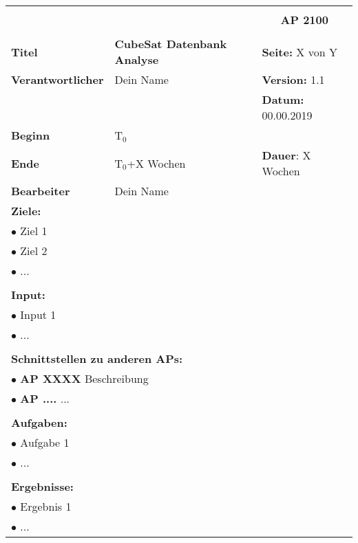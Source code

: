 \begin{table}[!h]
 \begin{center}
  \begin{tabular}{|p{35mm}||p{55mm}|p{50mm}||p{40mm}|}
   \hline
   \multicolumn{3}{|l||}{\textbf{}} & \multicolumn{1}{c|}{}\\
   \multicolumn{3}{|l||}{\textbf{}} & \multicolumn{1}{c|}{\textbf{AP 2100}}\\
   \multicolumn{3}{|l||}{\textbf{}} & \multicolumn{1}{c|}{}\\
   \hline\hline
   \textbf{Titel} & \multicolumn{2}{p{7cm}||}{\textbf{CubeSat Datenbank Analyse}} & \textbf{Seite:} X von Y\\
   \hline
   \textbf{Verantwortlicher} & \multicolumn{2}{l||}{Dein Name} & \textbf{Version:} 1.1\\
   \hline
   \multicolumn{3}{|l||}{} & \textbf{Datum:} 00.00.2019\\
   \hline\hline
   \textbf{Beginn} & \multicolumn{2}{l||}{T$_0$} & \\
   \hline
   \textbf{Ende} & \multicolumn{2}{l||}{T$_0$+X Wochen} & \textbf{Dauer}: X Wochen\\
   \hline\hline
   \textbf{Bearbeiter} & \multicolumn{3}{l|}{Dein Name}\\
   \hline\hline
   \multicolumn{4}{|p{150mm}|}{\textbf{Ziele:}}\\
   \multicolumn{4}{|p{150mm}|}{$\bullet$ Ziel 1}\\
   \multicolumn{4}{|p{150mm}|}{$\bullet$ Ziel 2}\\
   \multicolumn{4}{|p{150mm}|}{$\bullet$ ...}\\
   \multicolumn{4}{|p{150mm}|}{}\\
   \multicolumn{4}{|p{150mm}|}{\textbf{Input:}}\\
   \multicolumn{4}{|p{150mm}|}{$\bullet$ Input 1}\\
   \multicolumn{4}{|p{150mm}|}{$\bullet$ ...}\\
   \multicolumn{4}{|p{150mm}|}{}\\
   \multicolumn{4}{|p{150mm}|}{\textbf{Schnittstellen zu anderen APs:}}\\
   \multicolumn{4}{|p{150mm}|}{$\bullet$ \textbf{AP XXXX} Beschreibung}\\
   \multicolumn{4}{|p{150mm}|}{$\bullet$ \textbf{AP ....} ...}\\
   \multicolumn{4}{|p{150mm}|}{}\\
   \multicolumn{4}{|p{150mm}|}{\textbf{Aufgaben:}}\\
   \multicolumn{4}{|p{150mm}|}{$\bullet$ Aufgabe 1}\\
   \multicolumn{4}{|p{150mm}|}{$\bullet$ ...}\\
   \multicolumn{4}{|p{150mm}|}{}\\
   \multicolumn{4}{|p{150mm}|}{\textbf{Ergebnisse:}}\\
   \multicolumn{4}{|p{150mm}|}{$\bullet$ Ergebnis 1}\\
   \multicolumn{4}{|p{150mm}|}{$\bullet$ ...}\\
   \hline
  \end{tabular}
 \end{center}
\end{table}


